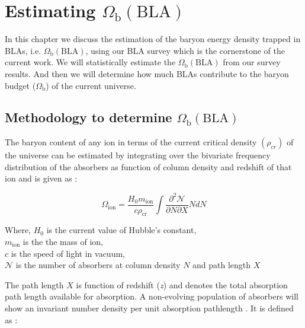 \chapter{Estimating $\Omega_\text{b}(\text{BLA})$} \label{ch:Omega-b}

In this chapter we discuss the estimation of the baryon energy density trapped in BLAs, i.e. $\Omega_\text{b}(\text{BLA})$, using our BLA survey which is the cornerstone of the current work. We will statistically estimate the $\Omega_\text{b}(\text{BLA})$ from our survey results. And then we will determine how much BLAs contribute to the baryon budget ($\Omega_\text{b}$) of the current universe.

\section{Methodology to determine $\Omega_\text{b}(\text{BLA})$}

The baryon content of any ion in terms of the current critical density $(\rho_{cr})$ of the universe can be estimated by integrating over the bivariate frequency distribution of the absorbers as function of column density and redshift of that ion and is given as :

\begin{equation} \label{eqn:omega_ion}
    \Omega_{\text{ion}} = \frac{H_0 m_{\text{ion}}}{c \rho_{\text{cr}}} \int \frac{\partial ^2 \mathcal{N}}{\partial N \partial X} N dN 
\end{equation}

\vspace*{3mm}

Where, $H_0$ is the current value of Hubble's constant, \\ \hspace*{19mm}
$m_\text{ion}$ is the the mass of ion, \\ \hspace*{19mm}
$c$ is the speed of light in vacuum, \\ \hspace*{19mm}
$\mathcal{N}$ is the number of absorbers at column density $N$ and path length $X$

\newpage

The path length $X$ is function of redshift (\emph{z}) and denotes the total absorption path length available for absorption. A non-evolving population of absorbers will show an invariant number density per unit absorption pathlength \citep{Becker-2011}. It is defined as :

